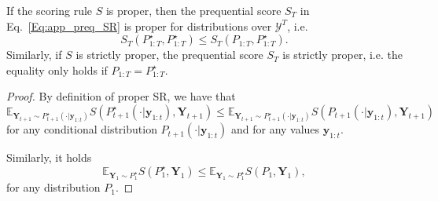 \documentclass[twoside,11pt]{article}
\newcommand{\E}{\mathbb{E}}
\newcommand{\Ddobs}{\mathbf{Y}}
\newcommand{\ddobsupt}{\mathbf{y}_{1:t}}
\begin{document}
	
	\begin{theorem}\label{th:propriety_generic}
		If the scoring rule $ S $ is proper, then the prequential score $ S_T$ in Eq.~\eqref{Eq:app_preq_SR} is proper for distributions over $ \mathcal{Y}^T $, i.e.
		\begin{equation}\label{}
		S_T(P_{1:T}^\star, P_{1:T}^\star)\le 	S_T(P_{1:T}, P_{1:T}^\star).
		\end{equation}
		Similarly, if $ S $ is strictly proper, the prequential score $ S_T $ is strictly proper, i.e. the equality only holds if $ P_{1:T}=P_{1:T}^\star $.
	\end{theorem}
	\begin{proof}
		By definition of proper SR, we have that
		\begin{equation}\label{}
		\E_{\Ddobs_{t+1}\sim P_{t+1}^\star(\cdot|\ddobsupt)} S(P^\star_{t+1}(\cdot|\ddobsupt) ,\Ddobs_{t+1}) \le \E_{\Ddobs_{t+1}\sim P_{t+1}^\star(\cdot|\ddobsupt)} S(P_{t+1}(\cdot|\ddobsupt), \Ddobs_{t+1})
		\end{equation}
		for any conditional distribution $ P_{t+1}(\cdot|\ddobsupt) $ and for any values $ \ddobsupt $.
		
		Similarly, it holds
		\begin{equation}\label{Eq:preq_SR_proof1}
		\E_{\Ddobs_{1}\sim P_{1}^\star} S(P^\star_{1} ,\Ddobs_{1}) \le \E_{\Ddobs_{1}\sim P_{1}^\star} S(P_{1}, \Ddobs_{1}),
		\end{equation}
		for any distribution $ P_1 $.
		

\end{proof}
\end{document}
